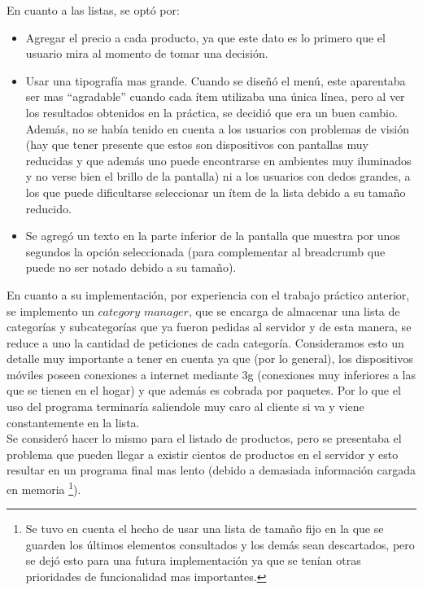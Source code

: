 \documentclass[english]{article}
\begin{document}
En cuanto a las listas, se optó por: 
\begin{itemize}
\item Agregar el precio a cada producto, ya que este dato es lo primero
que el usuario mira al momento de tomar una decisión. 
\item Usar una tipografía mas grande. Cuando se diseñó el menú, este aparentaba
ser mas {}``agradable” cuando cada ítem utilizaba una única línea,
pero al ver los resultados obtenidos en la práctica, se decidió que
era un buen cambio. Además, no se había tenido en cuenta a los usuarios
con problemas de visión (hay que tener presente que estos son dispositivos
con pantallas muy reducidas y que además uno puede encontrarse en
ambientes muy iluminados y no verse bien el brillo de la pantalla)
ni a los usuarios con dedos grandes, a los que puede dificultarse
seleccionar un ítem de la lista debido a su tamaño reducido. 
\item Se agregó un texto en la parte inferior de la pantalla que muestra
por unos segundos la opción seleccionada (para complementar al breadcrumb
que puede no ser notado debido a su tamaño).\\

\end{itemize}
En cuanto a su implementación, por experiencia con el trabajo práctico
anterior, se implemento un \textquotedbl{}$category$ $manager$\textquotedbl{},
que se encarga de almacenar una lista de categorías y subcategorías
que ya fueron pedidas al servidor y de esta manera, se reduce a uno
la cantidad de peticiones de cada categoría. Consideramos esto un
detalle muy importante a tener en cuenta ya que (por lo general),
los dispositivos móviles poseen conexiones a internet mediante 3g
(conexiones muy inferiores a las que se tienen en el hogar) y que
además es cobrada por paquetes. Por lo que el uso del programa terminaría
saliendole muy caro al cliente si va y viene constantemente en la lista.\\
 Se consideró hacer lo mismo para el listado de productos, pero
se presentaba el problema que pueden llegar a existir cientos de productos
en el servidor y esto resultar en un programa final mas lento (debido
a demasiada información cargada en memoria%
\footnote{Se tuvo en cuenta el hecho de usar una lista de tamaño fijo en la
que se guarden los últimos elementos consultados y los demás sean
descartados, pero se dejó esto para una futura implementación ya que
se tenían otras prioridades de funcionalidad mas importantes.%
}).\\
 
\end{document}
